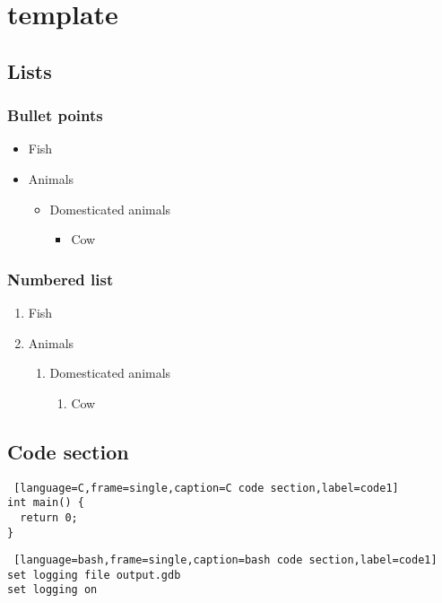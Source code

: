 \chapter{template}

\section{Lists}

\subsection{Bullet points}
\begin{itemize}
  \item Fish
  \item Animals
  \begin{itemize}
    \item Domesticated animals
    \begin{itemize}
      \item Cow
    \end{itemize}
  \end{itemize}
\end{itemize}
  
\subsection{Numbered list}

\begin{enumerate}
  \item Fish
  \item Animals
  \begin{enumerate}
    \item Domesticated animals
    \begin{enumerate}
      \item Cow
    \end{enumerate}
  \end{enumerate}
\end{enumerate}

\section{Code section}
\begin{lstlisting} [language=C,frame=single,caption=C code section,label=code1]
int main() {
  return 0;
}
\end{lstlisting}

\begin{lstlisting} [language=bash,frame=single,caption=bash code section,label=code1]
set logging file output.gdb
set logging on
\end{lstlisting}

